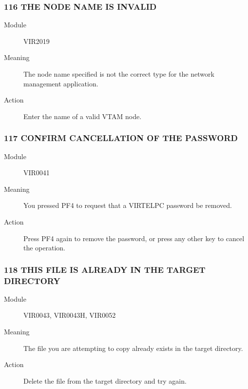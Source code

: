 \documentclass[letterpaper,10pt,english]{sphinxmanual}
\begin{document}
\subsubsection{116 THE NODE NAME IS INVALID}
\label{\detokenize{messages:the-node-name-is-invalid}}\begin{description}
\item[{Module}] \leavevmode
VIR2019

\item[{Meaning}] \leavevmode
The node name specified is not the correct type for the network management application.

\item[{Action}] \leavevmode
Enter the name of a valid VTAM node.

\end{description}


\subsubsection{117 CONFIRM CANCELLATION OF THE PASSWORD}
\label{\detokenize{messages:confirm-cancellation-of-the-password}}\begin{description}
\item[{Module}] \leavevmode
VIR0041

\item[{Meaning}] \leavevmode
You pressed PF4 to request that a VIRTELPC password be removed.

\item[{Action}] \leavevmode
Press PF4 again to remove the password, or press any other key to cancel the operation.

\end{description}


\subsubsection{118 THIS FILE IS ALREADY IN THE TARGET DIRECTORY}
\label{\detokenize{messages:this-file-is-already-in-the-target-directory}}\begin{description}
\item[{Module}] \leavevmode
VIR0043, VIR0043H, VIR0052

\item[{Meaning}] \leavevmode
The file you are attempting to copy already exists in the target directory.

\item[{Action}] \leavevmode
Delete the file from the target directory and try again.

\end{description}
\end{document}
